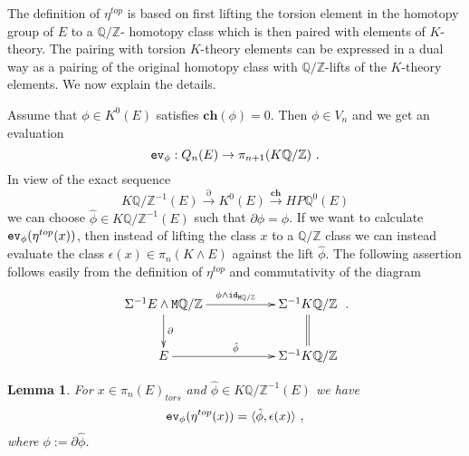 \documentclass[12pt]{article}
\newtheorem{lem}[theorem]{Lemma}
\newcommand{\Thom}{{\tt Thom}}
\newcommand{\ev}{{\tt ev}}
\newcommand{\id}{{\tt id}}
\newcommand{\Z}{{\mathbb{Z}}}
\newcommand{\Q}{{\mathbb{Q}}}
\newcommand{\tM}{{\tt M}}
\newcommand{\ch}{{\mathbf{ch}}}
\begin{document}
The definition of $\eta^{top}$ is based on first lifting the torsion element in the homotopy group  of $E$ to a $\Q/\Z$- homotopy class   which is then paired with elements of $K$-theory. The pairing with torsion $K$-theory elements can be expressed in a dual way as a pairing of the original homotopy class with $\Q/\Z$-lifts of the $K$-theory elements. We now explain the details.

Assume that $\phi\in K^{0}(E)$ satisfies $\ch(\phi)=0$.
Then $\phi\in V_{n}$ and we get an evaluation $$\ev_{\phi}:Q_{n}(E)\to \pi_{n+1}(K\Q/\Z)\ .$$
In view of the exact sequence
$$K\Q/\Z^{-1}(E)\stackrel{\partial}{\to} K^{0}(E)\stackrel{\ch}{\to} HP\Q^{0}(E)$$
we can choose 
$\hat \phi \in K\Q/\Z^{-1}(E)$ such that $\partial \hat \phi=\phi$.
If we want to calculate $\ev_{\phi}(\eta^{top}(x))$, then instead of lifting the class $x$ to a $\Q/\Z$ class we can instead evaluate the class $\epsilon(x)\in \pi_{n}(K\wedge E)$ against the lift $\hat \phi$.
The following assertion follows easily from the definition of $\eta^{top}$ and  commutativity of  the diagram
$$\xymatrix{\Sigma^{-1}E \wedge \tM\Q/\Z\ar[rr]^{\phi\wedge \id_{\tM\Q/\Z}}\ar[d]^{\partial}&&\Sigma^{-1}K\Q/\Z\ar@{=}[d]\\
E\ar[rr]^{\hat \phi}&&\Sigma^{-1}K\Q/\Z}\ .$$
\begin{lem}\label{lem900}
For $x\in \pi_{n}(E)_{tors}$ and $\hat \phi\in K\Q/\Z^{-1}(E)$   we have
$$\ev_{\phi}(\eta^{top}(x))=\langle  \hat \phi,\epsilon(x) \rangle\ ,$$
where  $\phi:=\partial \hat \phi$.
\end{lem}

\bigskip 
\end{document}
